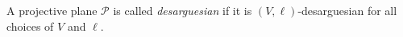 A projective plane $\mathcal{P}$ is called \emph{desarguesian} if it is $(V,\ell)$-desarguesian for all choices of $V$ and $\ell$.
